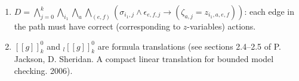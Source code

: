 \documentclass[a4paper]{article}
\begin{document}
\begin{enumerate}
\item $D =  \bigwedge\limits_{j = 0}^k \bigwedge\limits_{i_1} \bigwedge\limits_{a} \bigwedge\limits_{(e, f)} \left( \sigma_{i_1, j} \land \epsilon_{e, f, j} \to \left( \zeta_{a, j} = z_{i_1, a, e, f}\right)\right)$: each edge in the path must have correct (corresponding to $z$-variables) actions.
\item $[[g]]_k^0$ and ${_l}[[g]]_k^0$ are formula translations (see sections 2.4--2.5 of P. Jackson, D. Sheridan. A compact linear translation for bounded model checking. 2006).
\end{enumerate}
\end{document}
